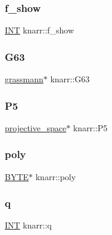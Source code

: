 \mbox{\label{classknarr_ac33e2d33577532c229bd9e9e4335c610}} 
\subsubsection{\texorpdfstring{f\+\_\+show}{f\_show}}
{\footnotesize\ttfamily \mbox{\hyperlink{galois_8h_a09fddde158a3a20bd2dcadb609de11dc}{I\+NT}} knarr\+::f\+\_\+show}

\mbox{\label{classknarr_ae64c7ca3aa8ef30547bd331d0c4b0738}} 
\subsubsection{\texorpdfstring{G63}{G63}}
{\footnotesize\ttfamily \mbox{\hyperlink{classgrassmann}{grassmann}}$\ast$ knarr\+::\+G63}

\mbox{\label{classknarr_a34c211a2932e4ca662d8f18e86138bd8}} 
\subsubsection{\texorpdfstring{P5}{P5}}
{\footnotesize\ttfamily \mbox{\hyperlink{classprojective__space}{projective\+\_\+space}}$\ast$ knarr\+::\+P5}

\mbox{\label{classknarr_a0d6419dc2f1ab767c8f5a47ec99e37fd}} 
\subsubsection{\texorpdfstring{poly}{poly}}
{\footnotesize\ttfamily \mbox{\hyperlink{galois_8h_ab6cc7b4aeb6ea31aba2b3fbfc83ff5e6}{B\+Y\+TE}}$\ast$ knarr\+::poly}

\mbox{\label{classknarr_a3fdb22a03f5252f8c4b29596feb648e8}} 
\subsubsection{\texorpdfstring{q}{q}}
{\footnotesize\ttfamily \mbox{\hyperlink{galois_8h_a09fddde158a3a20bd2dcadb609de11dc}{I\+NT}} knarr\+::q}


